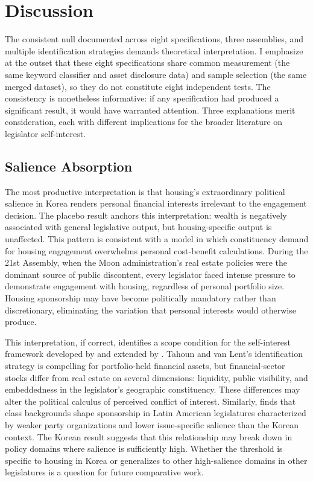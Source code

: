 \documentclass[11pt]{article}
\begin{document}
\section{Discussion}
\label{sec:discussion}

The consistent null documented across eight specifications, three assemblies, and multiple identification strategies demands theoretical interpretation. I emphasize at the outset that these eight specifications share common measurement (the same keyword classifier and asset disclosure data) and sample selection (the same merged dataset), so they do not constitute eight independent tests. The consistency is nonetheless informative: if any specification had produced a significant result, it would have warranted attention. Three explanations merit consideration, each with different implications for the broader literature on legislator self-interest.

\subsection{Salience Absorption}

The most productive interpretation is that housing's extraordinary political salience in Korea renders personal financial interests irrelevant to the engagement decision. The placebo result anchors this interpretation: wealth is negatively associated with general legislative output, but housing-specific output is unaffected. This pattern is consistent with a model in which constituency demand for housing engagement overwhelms personal cost-benefit calculations. During the 21st Assembly, when the Moon administration's real estate policies were the dominant source of public discontent, every legislator faced intense pressure to demonstrate engagement with housing, regardless of personal portfolio size. Housing sponsorship may have become politically mandatory rather than discretionary, eliminating the variation that personal interests would otherwise produce.

This interpretation, if correct, identifies a scope condition for the self-interest framework developed by \citet{tahoun2018} and extended by \citet{lupu2015}. Tahoun and van Lent's identification strategy is compelling for portfolio-held financial assets, but financial-sector stocks differ from real estate on several dimensions: liquidity, public visibility, and embeddedness in the legislator's geographic constituency. These differences may alter the political calculus of perceived conflict of interest. Similarly, \citet{lupu2015} finds that class backgrounds shape sponsorship in Latin American legislatures characterized by weaker party organizations and lower issue-specific salience than the Korean context. The Korean result suggests that this relationship may break down in policy domains where salience is sufficiently high. Whether the threshold is specific to housing in Korea or generalizes to other high-salience domains in other legislatures is a question for future comparative work.
\end{document}
